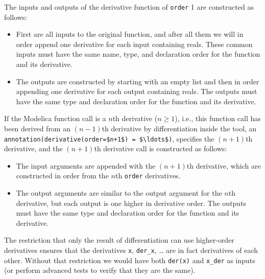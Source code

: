 The inputs and outputs of the derivative function of {\lstinline!order!} 1 are constructed as follows:
\begin{itemize}
\item
  First are all inputs to the original function, and after all them we will in order append one derivative for each input containing reals.
  These common inputs must have the same name, type, and declaration order for the function and its derivative.
\item
  The outputs are constructed by starting with an empty list and then in order appending one derivative for each output containing reals.
  The outputs must have the same type and declaration order for the function and its derivative.
\end{itemize}

If the Modelica function call is a $n$th derivative ($n \geq 1$), i.e., this function call has been derived from an $(n-1)$th derivative by differentiation inside the tool, an {\lstinline!annotation(derivative(order=$n+1$) = $\ldots$)!}, specifies the $(n+1)$th derivative, and the $(n+1)$th derivative call is constructed as follows:
\begin{itemize}
\item
  The input arguments are appended with the $(n+1)$th derivative, which are constructed in order from the $n$th {\lstinline!order!} derivatives.
\item
  The output arguments are similar to the output argument for the $n$th derivative, but each output is one higher in derivative order.
  The outputs must have the same type and declaration order for the function and its derivative.
\end{itemize}

\begin{nonnormative}
The restriction that only the result of differentiation can use higher-order derivatives ensures that the derivatives {\lstinline!x!}, {\lstinline!der_x!}, \ldots{} are in fact derivatives of each other.
Without that restriction we would have both {\lstinline!der(x)!} and {\lstinline!x_der!} as inputs (or perform advanced tests to verify that they are the same).
\end{nonnormative}

